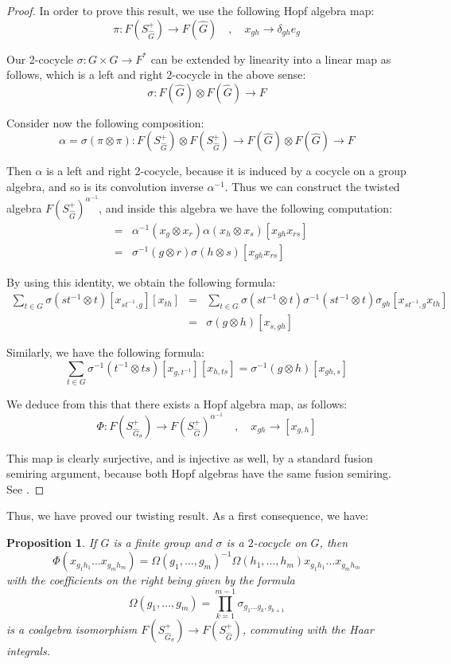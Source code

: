 \documentclass[12pt]{amsbook}
\newtheorem{proposition}[theorem]{Proposition}
\begin{document}
\begin{proof}
In order to prove this result, we use the following Hopf algebra map: 
$$\pi:F(S_{\widehat{G}}^+)\to F(\widehat{G})\quad,\quad
x_{gh}\to\delta_{gh}e_g$$

Our 2-cocycle $\sigma:G\times G\to F^*$ can be extended by linearity into a linear map as follows, which is a left and right 2-cocycle in the above sense:
$$\sigma:F(\widehat{G})\otimes F(\widehat{G})\to F$$

Consider now the following composition:
$$\alpha=\sigma(\pi \otimes \pi):F(S_{\widehat{G}}^+)\otimes F(S_{\widehat{G}}^+)\to F(\widehat{G})\otimes F(\widehat{G})\to F$$

Then $\alpha$ is a left and right 2-cocycle, because it is induced by a cocycle on a group algebra, and so is its convolution inverse $\alpha^{-1}$. Thus we can construct the twisted algebra $F(S_{\widehat{G}}^+)^{\alpha^{-1}}$, and inside this algebra we have the following computation:
\begin{eqnarray*}
[x_{gh}][x_{rs}]
&=&\alpha^{-1}(x_g\otimes x_r)\alpha(x_h\otimes x_s)[x_{gh}x_{rs}]\\
&=&\sigma^{-1}(g\otimes r)\sigma(h\otimes s)[x_{gh}x_{rs}]
\end{eqnarray*}

By using this identity, we obtain the following formula:
\begin{eqnarray*}
\sum_{t\in G}\sigma(st^{-1}\otimes t)[x_{st^{-1},g}][x_{th}]
&=&\sum_{t\in G}\sigma(st^{-1}\otimes t)\sigma^{-1}(st^{-1}\otimes t)\sigma_{gh}[x_{st^{-1},g}x_{th}]\\
&=&\sigma(g\otimes h)[x_{s,gh}]
\end{eqnarray*}

Similarly, we have the following formula:
$$\sum_{t\in G}\sigma^{-1}(t^{-1}\otimes ts)[x_{g,t^{-1}}][x_{h,ts}]=\sigma^{-1}(g\otimes h)[x_{gh,s}]$$

We deduce from this that there exists a Hopf algebra map, as follows:
$$\Phi:F(S_{\widehat{G}_\sigma}^+)\to F(S_{\widehat{G}}^+)^{\alpha^{-1}}\quad,\quad 
x_{gh}\to [x_{g,h}]$$

This map is clearly surjective, and is injective as well, by a standard fusion semiring argument, because both Hopf algebras have the same fusion semiring. See \cite{bbs}.
\end{proof}

Thus, we have proved our twisting result. As a first consequence, we have: 

\begin{proposition}
If $G$ is a finite group and $\sigma$ is a $2$-cocycle on $G$, then
$$\Phi(x_{g_1h_1}\ldots x_{g_mh_m})=\Omega(g_1,\ldots,g_m)^{-1}\Omega(h_1,\ldots,h_m)x_{g_1h_1}\ldots x_{g_mh_m}$$
with the coefficients on the right being given by the formula
$$\Omega(g_1,\ldots,g_m)=\prod_{k=1}^{m-1}\sigma_{g_1\ldots g_k,g_{k+1}}$$
is a coalgebra isomorphism $F(S_{\widehat{G}_\sigma}^+)\to F(S_{\widehat{G}}^+)$, commuting with the Haar integrals.
\end{proposition}
\end{document}
